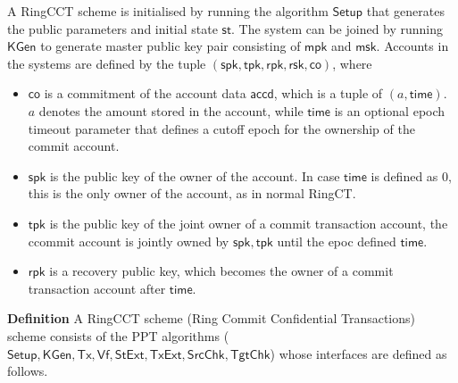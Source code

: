 \documentclass{article}      	%
\begin{document}
A RingCCT scheme is initialised by running the algorithm $\mathsf{Setup}$ that generates the public parameters and initial state $\mathsf{st}$. The system can be joined by running $\mathsf{KGen}$ to generate master public key pair consisting of $\mathsf{mpk}$ and $\mathsf{msk}$.
Accounts in the systems are defined by the tuple $(\mathsf{spk}, \mathsf{tpk}, \mathsf{rpk}, \mathsf{rsk}, \mathsf{co})$, where 
\begin{itemize}
	\item $\mathsf{co}$ is a commitment of the account data $\mathsf{accd}$, which is a tuple of $(a, \mathsf{time})$. $a$ denotes the amount stored in the account, while $\mathsf{time}$ is an optional epoch timeout parameter that defines a cutoff epoch for the ownership of the commit account.
	\item $\mathsf{spk}$ is the public key of the owner of the account. In case $\mathsf{time}$ is defined as 0, this is the only owner of the account, as in normal RingCT.
	\item $\mathsf{tpk}$ is the public key of the joint owner of a commit transaction account, the ccommit account is jointly owned by $\mathsf{spk}, \mathsf{tpk}$ until the epoc defined $\mathsf{time}$.
	\item $\mathsf{rpk}$ is a recovery public key, which becomes the owner of a commit transaction account after $\mathsf{time}$.
\end{itemize}

\textbf{Definition} A RingCCT scheme (Ring Commit Confidential Transactions) scheme consists of the PPT algorithms ($\mathsf{Setup,KGen,Tx,Vf,StExt,TxExt,SrcChk,TgtChk}$) whose interfaces are defined as follows.
\end{document}
